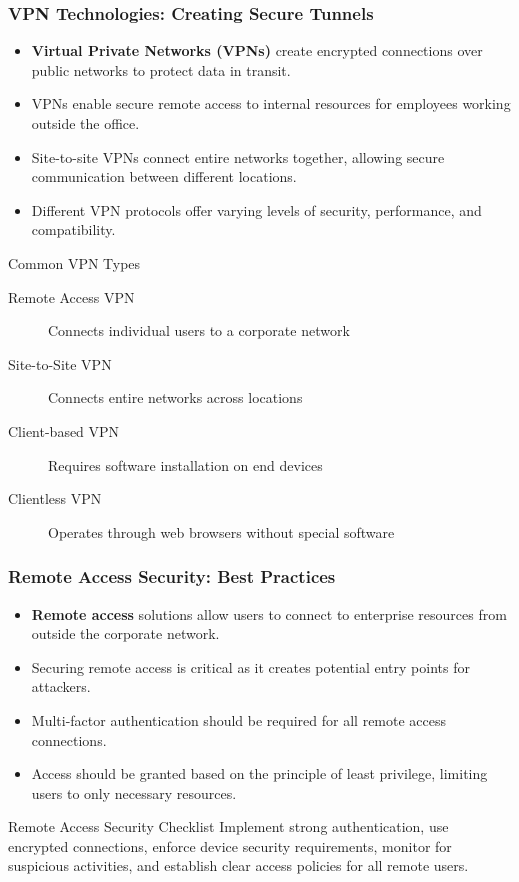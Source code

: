 \documentclass{beamer}
\begin{document}
\begin{frame}
    \frametitle{VPN Technologies: Creating Secure Tunnels}
    \begin{itemize}
        \item \textbf{Virtual Private Networks (VPNs)} create encrypted connections over public networks to protect data in transit.
        \item VPNs enable secure remote access to internal resources for employees working outside the office.
        \item Site-to-site VPNs connect entire networks together, allowing secure communication between different locations.
        \item Different VPN protocols offer varying levels of security, performance, and compatibility.
    \end{itemize}
    
    \begin{block}{Common VPN Types}
        \begin{description}
            \item[Remote Access VPN] Connects individual users to a corporate network
            \item[Site-to-Site VPN] Connects entire networks across locations
            \item[Client-based VPN] Requires software installation on end devices
            \item[Clientless VPN] Operates through web browsers without special software
        \end{description}
    \end{block}
\end{frame}

\begin{frame}
    \frametitle{Remote Access Security: Best Practices}
    \begin{itemize}
        \item \textbf{Remote access} solutions allow users to connect to enterprise resources from outside the corporate network.
        \item Securing remote access is critical as it creates potential entry points for attackers.
        \item Multi-factor authentication should be required for all remote access connections.
        \item Access should be granted based on the principle of least privilege, limiting users to only necessary resources.
    \end{itemize}
    
    \begin{alertblock}{Remote Access Security Checklist}
        Implement strong authentication, use encrypted connections, enforce device security requirements, monitor for suspicious activities, and establish clear access policies for all remote users.
    \end{alertblock}
\end{frame}
\end{document}
